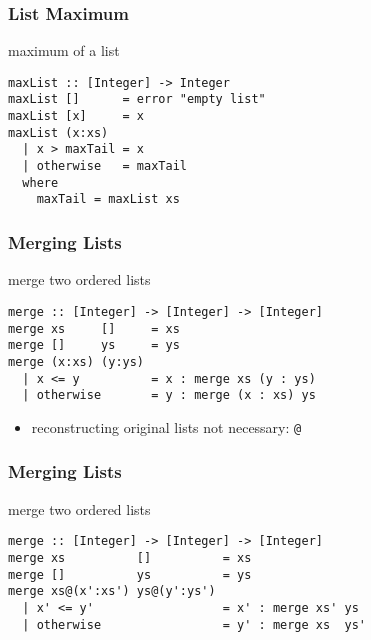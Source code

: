 \documentclass[dvipsnames]{beamer}
\theoremstyle{plain}
\begin{document}
\begin{frame}[fragile]
  \frametitle{List Maximum}

  \begin{exampleblock}{maximum of a list}
    \begin{lstlisting}
maxList :: [Integer] -> Integer
maxList []      = error "empty list"
maxList [x]     = x
maxList (x:xs)
  | x > maxTail = x
  | otherwise   = maxTail
  where
    maxTail = maxList xs
    \end{lstlisting}
  \end{exampleblock}
\end{frame}

\begin{frame}[fragile]
  \frametitle{Merging Lists}

  \begin{exampleblock}{merge two ordered lists}
    \begin{lstlisting}
merge :: [Integer] -> [Integer] -> [Integer]
merge xs     []     = xs
merge []     ys     = ys
merge (x:xs) (y:ys)
  | x <= y          = x : merge xs (y : ys)
  | otherwise       = y : merge (x : xs) ys
    \end{lstlisting}
  \end{exampleblock}

  \begin{itemize}
    \item reconstructing original lists not necessary: \lstinline|@|
  \end{itemize}
\end{frame}

\begin{frame}[fragile]
  \frametitle{Merging Lists}

  \begin{exampleblock}{merge two ordered lists}
    \begin{lstlisting}
merge :: [Integer] -> [Integer] -> [Integer]
merge xs          []          = xs
merge []          ys          = ys
merge xs@(x':xs') ys@(y':ys')
  | x' <= y'                  = x' : merge xs' ys
  | otherwise                 = y' : merge xs  ys'
    \end{lstlisting}
  \end{exampleblock}
\end{frame}
\end{document}

